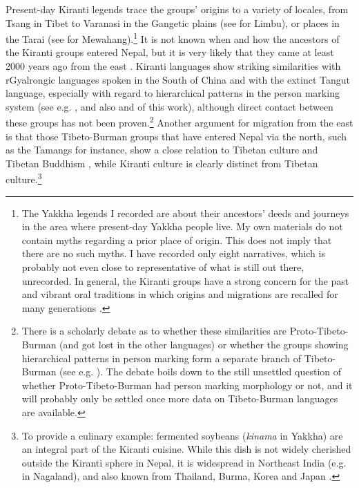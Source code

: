 Present-day Kiranti legends trace the groups' origins to a variety of locales, from Tsang in Tibet to Varanasi in the Gangetic plains (see \citealt[xix]{Driem1987A-grammar} for Limbu), or places in the Tarai (see \citealt[34]{Gaenszle2012_Where} for Mewahang).\footnote{The Yakkha legends I recorded are about their ancestors' deeds and journeys in the area where present-day Yakkha people live. My own materials do not contain myths regarding a prior place of origin. This does not imply that there are no such myths. I have recorded only eight narratives, which is probably not even close to representative of what is still out there, unrecorded. In general, the Kiranti groups have a strong concern for the past and vibrant oral traditions in which origins and migrations are recalled for many generations \citep{Gaenszle2000Origins, Gaenszle2002_Remaking}.} It is not known when and how the ancestors of the Kiranti groups entered Nepal, but it is very likely that they came at least 2000 years ago from the east \citep{Driem2001Languages, LaPolla2001_Role, Gaenszle2002_Remaking}. Kiranti languages show striking similarities with rGyalrongic languages spoken in the South of China and with the extinct Tangut language, especially with regard to hierarchical patterns in the person marking system (see e.g. \citet{DeLancey1981_Category, Ebert1990Evidence, LaPolla2007Hierarchical, Jacques2012_Agreement}, and also  and  of this work), although direct contact between these  groups has not been proven.\footnote{There is a scholarly debate as to whether these similarities are Proto-Tibeto-Burman (and got lost in the other languages) or whether the groups showing hierarchical patterns in person marking form a separate branch of Tibeto-Burman (see e.g. \citealt{Driem1991Tangut, LaPolla2001_Role, DeLancey2010_Towards, Jacques2012_Agreement, LaPolla2012_Comments}). The debate boils down to the still unsettled question of whether Proto-Tibeto-Burman had person marking morphology or not, and it will probably only be settled once more data on Tibeto-Burman languages are available.} Another argument for  migration from the east is that those Tibeto-Burman groups that have entered Nepal via the north, such as the Tamangs for instance, show a close relation to Tibetan culture and Tibetan Buddhism \citep{LaPolla2001_Role}, while Kiranti culture is clearly distinct from Tibetan culture.\footnote{To provide a culinary example: fermented soybeans (\emph{kinama} in Yakkha) are an integral part of the Kiranti cuisine. While this dish is not widely cherished outside the Kiranti sphere in Nepal, it is widespread in Northeast India (e.g. in Nagaland), and  also known from Thailand, Burma, Korea and Japan \citep{Tamang2010_fermented}.} 
 
